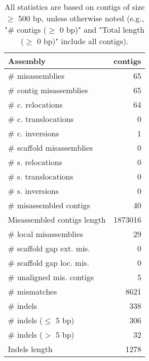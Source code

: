 \documentclass[12pt,a4paper]{article}
\begin{document}
\begin{table}[ht]
\begin{center}
\caption{All statistics are based on contigs of size $\geq$ 500 bp, unless otherwise noted (e.g., "\# contigs ($\geq$ 0 bp)" and "Total length ($\geq$ 0 bp)" include all contigs).}
\begin{tabular}{|l*{1}{|r}|}
\hline
Assembly & contigs \\ \hline
\# misassemblies & 65 \\ \hline
\hspace{2mm}\# contig misassemblies & 65 \\ \hline
\hspace{5mm}\# c. relocations & 64 \\ \hline
\hspace{5mm}\# c. translocations & 0 \\ \hline
\hspace{5mm}\# c. inversions & 1 \\ \hline
\hspace{2mm}\# scaffold misassemblies & 0 \\ \hline
\hspace{5mm}\# s. relocations & 0 \\ \hline
\hspace{5mm}\# s. translocations & 0 \\ \hline
\hspace{5mm}\# s. inversions & 0 \\ \hline
\# misassembled contigs & 40 \\ \hline
Misassembled contigs length & 1873016 \\ \hline
\# local misassemblies & 29 \\ \hline
\# scaffold gap ext. mis. & 0 \\ \hline
\# scaffold gap loc. mis. & 0 \\ \hline
\# unaligned mis. contigs & 5 \\ \hline
\# mismatches & 8621 \\ \hline
\# indels & 338 \\ \hline
\hspace{5mm}\# indels ($\leq$ 5 bp) & 306 \\ \hline
\hspace{5mm}\# indels ($>$ 5 bp) & 32 \\ \hline
Indels length & 1278 \\ \hline
\end{tabular}
\end{center}
\end{table}
\end{document}
